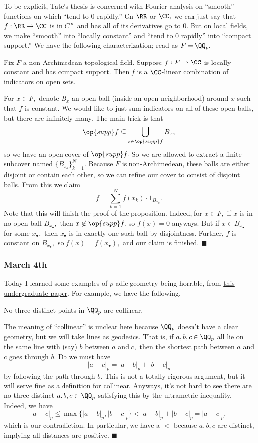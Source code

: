 To be explicit, Tate's thesis is concerned with Fourier analysis on ``smooth'' functions on which ``tend to $0$ rapidly.'' On $\RR$ or $\CC,$ we can just say that $f:\RR\to\CC$ is in $C^\infty$ and has all of its derivatives go to $0.$ But on local fields, we make ``smooth'' into ``locally constant'' and ``tend to $0$ rapidly'' into ``compact support.'' We have the following characterization; read as $F=\QQ_p.$
\begin{proposition}
    Fix $F$ a non-Archimedean topological field. Suppose $f:F\to\CC$ is locally constant and has compact support. Then $f$ is a $\CC$-linear combination of indicators on open sets.
\end{proposition}
For $x\in F,$ denote $B_x$ an open ball (inside an open neighborhood) around $x$ such that $f$ is constant. We would like to just sum indicators on all of these open balls, but there are infinitely many. The main trick is that
\[\op{supp}f\subseteq\bigcup_{x\in\op{supp}f}B_x,\]
so we have an open cover of $\op{supp}f.$ So we are allowed to extract a finite subcover named $\{B_{x_k}\}_{k=1}^N.$ Because $F$ is non-Archimedean, these balls are either disjoint or contain each other, so we can refine our cover to consist of disjoint balls. From this we claim
\[f=\sum_{k=1}^Nf(x_k)\cdot1_{B_{x_k}}.\]
Note that this will finish the proof of the proposition. Indeed, for $x\in F,$ if $x$ is in no open ball $B_{x_\bullet},$ then $x\not\in\op{supp}f,$ so $f(x)=0$ anyways. But if $x\in B_{x_\bullet}$ for some $x_\bullet,$ then $x_\bullet$ is in exactly one such ball by disjointness. Further, $f$ is constant on $B_{x_\bullet},$ so $f(x)=f(x_\bullet),$ and our claim is finished. $\blacksquare$

\subsubsection{March 4th}
Today I learned some examples of $p$-adic geometry being horrible, from \href{https://scholar.rose-hulman.edu/rhumj/vol8/iss1/2/}{this undergraduate paper}. For example, we have the following.
\begin{proposition}
    No three distinct points in $\QQ_p$ are collinear.
\end{proposition}
The meaning of ``collinear'' is unclear here because $\QQ_p$ doesn't have a clear geometry, but we will take lines as geodesics. That is, if $a,b,c\in\QQ_p$ all lie on the same line with (say) $b$ between $a$ and $c,$ then the shortest path between $a$ and $c$ goes through $b.$ Do we must have
\[|a-c|_p=|a-b|_p+|b-c|_p\]
by following the path through $b.$ This is not a totally rigorous argument, but it will serve fine as a definition for collinear. Anyways, it's not hard to see there are no three distinct $a,b,c\in\QQ_p$ satisfying this by the ultrametric inequality. Indeed, we have
\[|a-c|_p\le\max\{|a-b|_p,|b-c|_p\}<|a-b|_p+|b-c|_p=|a-c|_p,\]
which is our contradiction. In particular, we have a $<$ because $a,b,c$ are distinct, implying all distances are positive. $\blacksquare$

